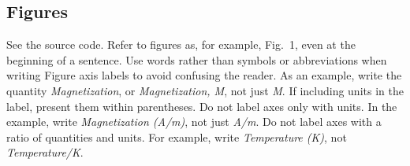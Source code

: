 \documentclass{IEEEtran4PSCC}
\begin{document}
\subsection{Figures}
%
%



%
%

See the source code. Refer to figures as, for example, Fig.~1, even at the beginning of a sentence. Use words rather than symbols or abbreviations when writing Figure axis labels to avoid confusing the reader. As an example, write the quantity \emph{Magnetization}, or \emph{Magnetization, M}, not just \emph{M}. If including units in the label, present them within parentheses. Do not label axes only with units. In the example, write \emph{Magnetization (A/m)}, not just \emph{A/m}. Do not label axes with a ratio of quantities and units. For example, write \emph{Temperature (K)}, not \emph{Temperature/K}.
\end{document}
